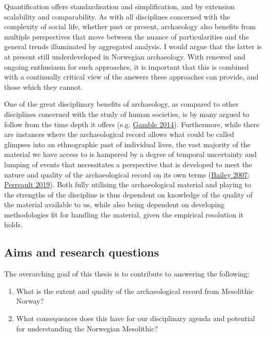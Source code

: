\documentclass[
  a4paper,
  oneside]{uiophdthesis}
\providecommand{\tightlist}{%
  \setlength{\itemsep}{0pt}\setlength{\parskip}{0pt}}
\begin{document}
Quantification offers standardisation and simplification, and by extension scalability and comparability. As with all disciplines concerned with the complexity of social life, whether past or present, archaeology also benefits from multiple perspectives that move between the nuance of particularities and the general trends illuminated by aggregated analysis. I would argue that the latter is at present still underdeveloped in Norwegian archaeology. With renewed and ongoing enthusiasm for such approaches, it is important that this is combined with a continually critical view of the answers these approaches can provide, and those which they cannot.

One of the great disciplinary benefits of archaeology, as compared to other disciplines concerned with the study of human societies, is by many argued to follow from the time depth it offers (e.g. \protect\hyperlink{ref-gamble2014}{Gamble 2014}). Furthermore, while there are instances where the archaeological record allows what could be called glimpses into an ethnographic past of individual lives, the vast majority of the material we have access to is hampered by a degree of temporal uncertainty and lumping of events that necessitates a perspective that is developed to meet the nature and quality of the archaeological record on its own terms (\protect\hyperlink{ref-bailey2007}{Bailey 2007}; \protect\hyperlink{ref-perreault2019}{Perreault 2019}). Both fully utilising the archaeological material and playing to the strengths of the discipline is thus dependent on knowledge of the quality of the material available to us, while also being dependent on developing methodologies fit for handling the material, given the empirical resolution it holds.

\hypertarget{aims-and-research-questions}{%
\subsection{Aims and research questions}\label{aims-and-research-questions}}

The overarching goal of this thesis is to contribute to answering the following:

\begin{enumerate}
\def\labelenumi{\roman{enumi})}
\tightlist
\item
  What is the extent and quality of the archaeological record from Mesolithic Norway?
\item
  What consequences does this have for our disciplinary agenda and potential for understanding the Norwegian Mesolithic?
\end{enumerate}
\end{document}
